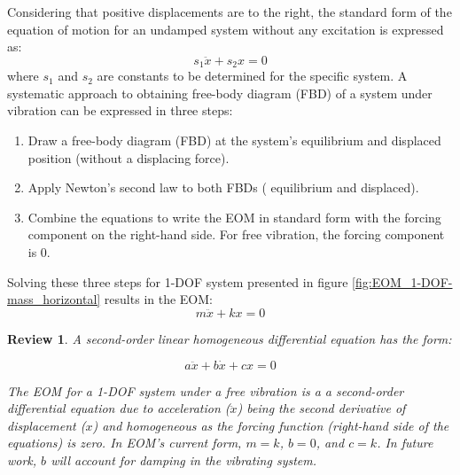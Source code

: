 \documentclass[12pt,letter]{article}
\numberwithin{ex}{section} %
\newtheorem{re}{Review}
\numberwithin{re}{section} %
\newenvironment{review}{\begin{mdframed}[middlelinewidth=2mm,roundcorner=20pt]\begin{re}\normalfont}{\end{re}\end{mdframed}}
\begin{document}
		Considering that positive displacements are to the right, the standard form of the equation of motion for an undamped system without any excitation is expressed as:  
		\begin{equation}
			s_1 \ddot{x} + s_2 x = 0
		\end{equation}			
		where $s_1$ and $s_2$ are constants to be determined for the specific system. A systematic approach to obtaining free-body diagram (FBD) of a system under vibration can be expressed in three steps:
		\begin{enumerate}
			\item Draw a free-body diagram (FBD) at the system's equilibrium and displaced position (without a displacing force).
			\item Apply Newton's second law to both FBDs ( equilibrium and displaced).
			\item Combine the equations to write the EOM in standard form with the forcing component on the right-hand side. For free vibration, the forcing component is 0. 
		\end{enumerate}
			
		Solving these three steps for 1-DOF system presented in figure \ref{fig:EOM_1-DOF-mass_horizontal} results in the EOM:
		\begin{equation}
			m \ddot{x} + k x = 0
		\end{equation}

		\begin{review}
			A second-order linear homogeneous differential equation has the form:
			
			\begin{equation}
			 a \ddot{x} + b \dot{x} + cx = 0
			\end{equation}
		
			\noindent The EOM for a 1-DOF system under a free vibration is a a second-order differential equation due to acceleration ($\ddot{x}$) being the second derivative of displacement ($x$) and homogeneous as the forcing function (right-hand side of the equations) is zero. In EOM's current form, $m=k$, $b=0$,  and $c=k$. In future work, $b$ will account for damping in the vibrating system.     
		\end{review}
\end{document}
